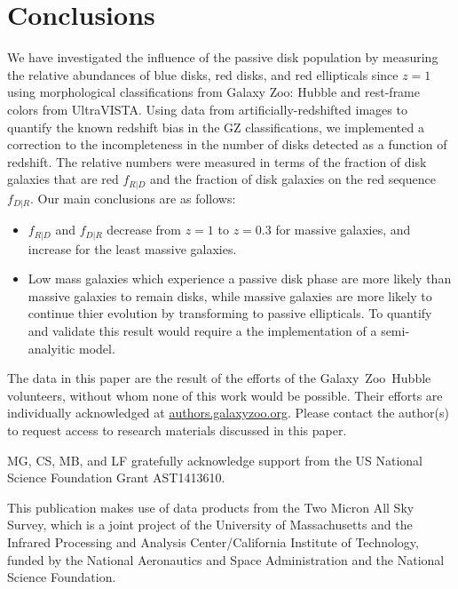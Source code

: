 \documentclass[useAMS,usenatbib]{mn2e}
\begin{document}
\section{Conclusions}
\label{sec:conclusions}

We have investigated the influence of the passive disk population by measuring the relative abundances of blue disks, red disks, and red ellipticals since $z=1$ using morphological classifications from Galaxy Zoo: Hubble and rest-frame colors from UltraVISTA. Using data from artificially-redshifted  images to quantify the known redshift bias in the GZ classifications, we implemented a correction to the incompleteness in the number of disks detected as a function of redshift. The relative numbers were measured in terms of the fraction of disk galaxies that are red $f_{R|D}$ and the fraction of disk galaxies on the red sequence $f_{D|R}$. Our main conclusions are as follows:

\begin{itemize}

\item{$f_{R|D}$ and $f_{D|R}$ decrease from $z=1$ to $z=0.3$ for massive galaxies, and increase for the least massive galaxies.}

\item{Low mass galaxies which experience a passive disk phase are more likely than massive galaxies to remain disks, while massive galaxies are more likely to continue thier evolution by transforming to passive ellipticals. To quantify and validate this result would require a the implementation of a semi-analyitic model.}


\end{itemize}





The data in this paper are the result of the efforts of the Galaxy~Zoo~Hubble volunteers, without whom none of this work would be possible. Their efforts are individually acknowledged at \url{authors.galaxyzoo.org}. Please contact the author(s) to request access to research materials discussed in this paper. 


MG, CS, MB, and LF gratefully acknowledge support from the US National
Science Foundation Grant AST1413610.

This publication makes use of data products from the Two Micron All Sky Survey, which is a joint project of the University of Massachusetts and the Infrared Processing and Analysis Center/California Institute of Technology, funded by the National Aeronautics and Space Administration and the National Science Foundation.
\end{document}
